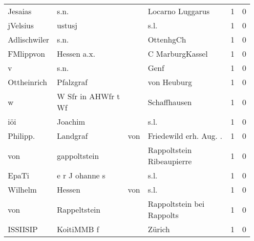 \begin{center}
\begin{tiny}
\begin{longtabu}{llllrr}
                  Jesaias &                               s.n. &             &                            Locarno Luggarus &          1 &         0 \\
                 jVelsius &                             ustusj &             &                                        s.l. &          1 &         0 \\
             Adlischwiler &                               s.n. &             &                                   OttenhgCh &          1 &         0 \\
                FMlippvon &                        Hessen a.x. &             &                             C MarburgKassel &          1 &         0 \\
                        v &                               s.n. &             &                                        Genf &          1 &         0 \\
              Ottheinrich &                          Pfalzgraf &             &                                 von Heuburg &          1 &         0 \\
                        w &                W Sfr in AHWfr t Wf &             &                                Schaffhausen &          1 &         0 \\
                      iöi &                            Joachim &             &                                        s.l. &          1 &         0 \\
                 Philipp. &                           Landgraf &         von &                     Friedewild erh. Aug. .  &          1 &         0 \\
                      von &                       gappoltstein &             &                   Rappoltstein Ribeaupierre &          1 &         0 \\
                    EpaTi &                     e r J ohanne s &             &                                        s.l. &          1 &         0 \\
                  Wilhelm &                             Hessen &         von &                                        s.l. &          1 &         0 \\
                      von &                       Rappeltstein &             &                   Rappoltstein bei Rappolts &          1 &         0 \\
                 ISSIISIP &                         KoitiMMB f &             &                                      Zürich &          1 &         0 \\

\end{longtabu}
\end{tiny}
\end{center}
